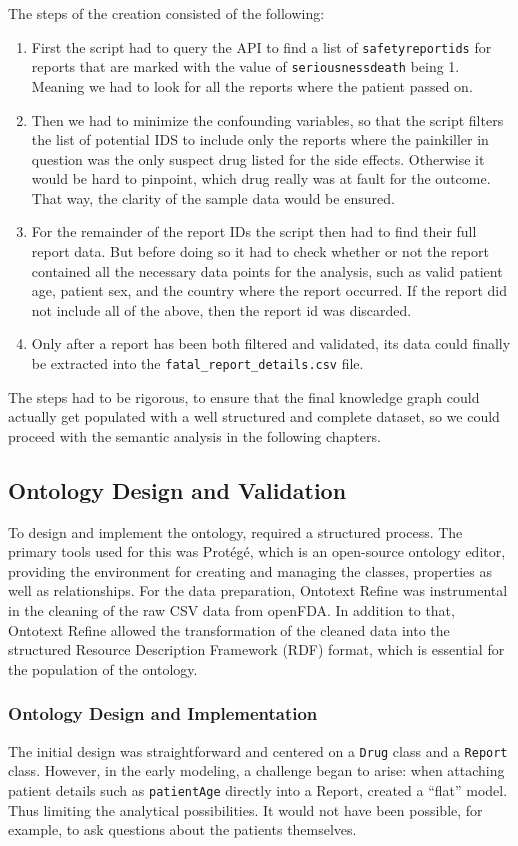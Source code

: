 The steps of the creation consisted of the following:
\begin{enumerate}
    \item First the script had to query the API to find a list of \nolinkurl{safetyreportids} for reports that are marked with the value of \nolinkurl{seriousnessdeath} being 1. Meaning we had to look for all the reports where the patient passed on.
    \item Then we had to minimize the confounding variables, so that the script filters the list of potential IDS to include only the reports where the painkiller in question was the only suspect drug listed for the side effects. Otherwise it would be hard to pinpoint, which drug really was at fault for the outcome. That way, the clarity of the sample data would be ensured.
    \item For the remainder of the report IDs the script then had to find their full report data. But before doing so it had to check whether or not the report contained all the necessary data points for the analysis, such as valid patient age, patient sex, and the country where the report occurred. If the report did not include all of the above, then the report id was discarded.
    \item Only after a report has been both filtered and validated, its data could finally be extracted into the \nolinkurl{fatal_report_details.csv} file.
\end{enumerate}
The steps had to be rigorous, to ensure that the final knowledge graph could actually get populated with a well structured and complete dataset, so we could proceed with the semantic analysis in the following chapters. 
\subsection{Ontology Design and Validation}
To design and implement the ontology, required a structured process. The primary tools used for this was Protégé, which is an open-source ontology editor, providing the environment for creating and managing the classes, properties as well as relationships. For the data preparation, Ontotext Refine was instrumental in the cleaning of the raw CSV data from openFDA. In addition to that, Ontotext Refine allowed the transformation of the cleaned data into the structured Resource Description Framework (RDF) format, which is essential for the population of the ontology. 
\subsubsection{Ontology Design and Implementation}
The initial design was straightforward and centered on a \texttt{Drug} class and a \texttt{Report} class. However, in the early modeling, a challenge began to arise: when attaching patient details such as \texttt{patientAge} directly into a Report, created a ``flat'' model. Thus limiting the analytical possibilities. It would not have been possible, for example, to ask questions about the patients themselves.

